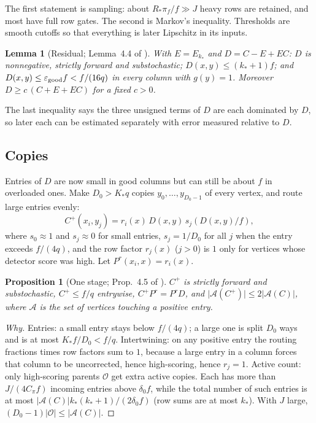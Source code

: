 \documentclass[11pt]{article}
\newtheorem{lemma}[theorem]{Lemma}
\newtheorem{proposition}[theorem]{Proposition}
\theoremstyle{definition}
\theoremstyle{remark}
\newcommand{\eps}{\varepsilon}
\newcommand{\abs}[1]{\lvert #1\rvert}
\begin{document}
The first statement is sampling: about $R_*\pi_f/f\gg J$ heavy rows are retained,
and most have full row gates. The second is Markov's inequality. Thresholds are
smooth cutoffs so that everything is later Lipschitz in its inputs.

\begin{lemma}[Residual; Lemma~4.4 of \cite{OpenAI-BPL}]\label{lem:residual}
With $E=E_{k_*}$ and $D=C-E+EC$: $D$ is nonnegative, strictly forward and
substochastic; $D(x,y)\le(k_*+1)f$; and $D(x,y)\le\eps_{\rm good}f<f/(16q)$ in
every column with $g(y)=1$. Moreover $D\ge c\,(C+E+EC)$ for a fixed $c>0$.
\end{lemma}

The last inequality says the three unsigned terms of $D$ are each dominated by
$D$, so later each can be estimated separately with error measured relative to $D$.

\subsection{Copies}\label{sec:copies}

Entries of $D$ are now small in good columns but can still be about $f$ in
overloaded ones. Make $D_0>K_*q$ copies $y_0,\dots,y_{D_0-1}$ of every vertex, and
route large entries evenly:
\[
C^+(x_i,y_j)=r_i(x)\,D(x,y)\,s_j(D(x,y)/f),
\]
where $s_0\approx1$ and $s_j\approx0$ for small entries, $s_j=1/D_0$ for all $j$ when
the entry exceeds $f/(4q)$, and the row factor $r_j(x)$ ($j>0$) is $1$ only for
vertices whose detector score was high. Let $P^r(x_i,x)=r_i(x)$.

\begin{proposition}[One stage; Prop.~4.5 of \cite{OpenAI-BPL}]\label{prop:stage}
$C^+$ is strictly forward and substochastic, $C^+\le f/q$ entrywise,
$C^+P^r=P^rD$, and $\abs{\mathcal A(C^+)}\le2\abs{\mathcal A(C)}$, where
$\mathcal A$ is the set of vertices touching a positive entry.
\end{proposition}

\begin{proof}[Why]
Entries: a small entry stays below $f/(4q)$; a large one is split $D_0$ ways and
is at most $K_*f/D_0<f/q$. Intertwining: on any positive entry the routing
fractions times row factors sum to $1$, because a large entry in a column forces
that column to be uncorrected, hence high-scoring, hence $r_j=1$. Active count:
only high-scoring parents $\mathcal O$ get extra active copies. Each has more than
$J/(4C_\pi f)$ incoming entries above $\delta_0f$, while the total number of such
entries is at most $\abs{\mathcal A(C)}k_*(k_*+1)/(2\delta_0f)$ (row sums are at
most $k_*$). With $J$ large, $(D_0-1)\abs{\mathcal O}\le\abs{\mathcal A(C)}$.
\end{proof}
\end{document}

